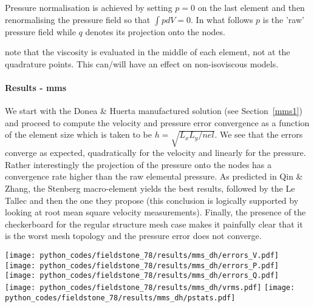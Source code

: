 Pressure normalisation is achieved by setting $p=0$ on the last element and then 
renormalising the pressure field so that $\int p dV=0$. In what follows $p$ is the 'raw' pressure
field while $q$ denotes its projection onto the nodes. 





{\color{red} note that the viscosity is evaluated in the middle of each element, not 
at the quadrature points. This can/will have an effect on non-isoviscous models.}


\paragraph{Results - mms}

We start with the Donea \& Huerta manufactured solution (see Section~\ref{mms1}) and 
proceed to compute the velocity and pressure error convergence as a function of the 
element size which is taken to be $h = \sqrt{L_xL_y/nel}$. We see that 
the errors converge as expected, quadratically for the velocity and linearly for the pressure.
Rather interestingly the projection of the pressure onto the nodes has a convergence rate 
higher than the raw elemental pressure. As predicted in Qin \& Zhang, the Stenberg macro-element 
yields the best results, followed by the Le Tallec and then the one they propose (this conclusion 
is logically supported by looking at root mean square velocity measurements). 
Finally, the presence of the checkerboard for the regular structure mesh case
makes it painfully clear that it is the worst mesh topology 
and the pressure error does not converge.  

\begin{center}
\texttt{[image: python\_codes/fieldstone\_78/results/mms\_dh/errors\_V.pdf]}
\texttt{[image: python\_codes/fieldstone\_78/results/mms\_dh/errors\_P.pdf]}
\texttt{[image: python\_codes/fieldstone\_78/results/mms\_dh/errors\_Q.pdf]}\\
\texttt{[image: python\_codes/fieldstone\_78/results/mms\_dh/vrms.pdf]}
\texttt{[image: python\_codes/fieldstone\_78/results/mms\_dh/pstats.pdf]}
\end{center}


